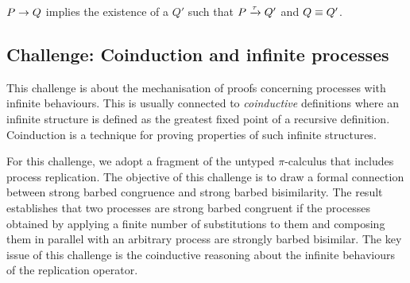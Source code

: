 \documentclass[runningheads]{llncs}
\begin{document}
\begin{theorem}
  \( P \rightarrow Q \) implies the existence of a \( Q' \) such that \( P \xrightarrow{\tau} Q' \) and \( Q \equiv Q' \).
\end{theorem}

\subsection{Challenge: Coinduction and infinite processes}
\label{sec:challenge:coinduction}
This challenge is about the mechanisation of proofs concerning processes with infinite behaviours.
%
This is usually connected to \emph{coinductive} definitions where an infinite
structure is defined as the greatest fixed point of a recursive
definition.
%
Coinduction is a technique for proving properties of
such infinite structures.
%
%
%

For this challenge, we adopt a fragment of the untyped $\pi$-calculus
that includes process replication.
The objective of this challenge is to %
draw a formal connection between strong barbed congruence and strong
barbed bisimilarity.  %
The result establishes that two processes are strong barbed congruent
if the processes obtained by applying a finite number of substitutions to
them and composing them in parallel with an arbitrary process are
strongly barbed bisimilar.
The key issue of this challenge is the coinductive reasoning about the infinite behaviours of the replication operator.
\end{document}
